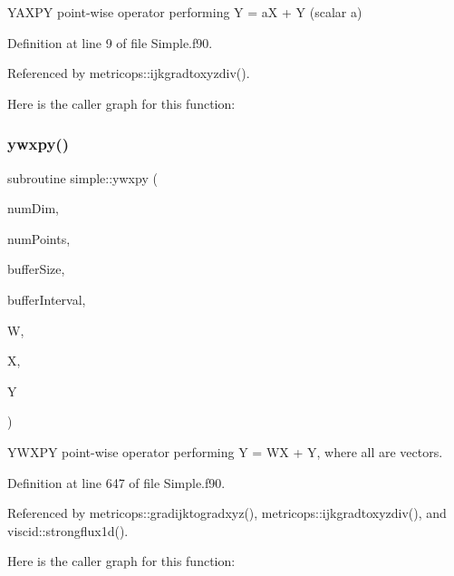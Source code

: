 Y\+A\+X\+PY point-\/wise operator performing Y = aX + Y (scalar a) 



Definition at line 9 of file Simple.\+f90.



Referenced by metricops\+::ijkgradtoxyzdiv().

Here is the caller graph for this function\+:
\hypertarget{namespacesimple_ac64e3827babc8b5361993623eb2a11ce}{}\label{namespacesimple_ac64e3827babc8b5361993623eb2a11ce} 
\subsubsection{\texorpdfstring{ywxpy()}{ywxpy()}}
{\footnotesize\ttfamily subroutine simple\+::ywxpy (\begin{DoxyParamCaption}\item[{integer(kind=4), intent(in)}]{num\+Dim,  }\item[{integer(kind=8), intent(in)}]{num\+Points,  }\item[{integer(kind=8), dimension(numdim), intent(in)}]{buffer\+Size,  }\item[{integer(kind=8), dimension(2$\ast$numdim), intent(in)}]{buffer\+Interval,  }\item[{real(kind=8), dimension(numpoints), intent(in)}]{W,  }\item[{real(kind=8), dimension(numpoints), intent(in)}]{X,  }\item[{real(kind=8), dimension(numpoints), intent(inout)}]{Y }\end{DoxyParamCaption})}



Y\+W\+X\+PY point-\/wise operator performing Y = WX + Y, where all are vectors. 



Definition at line 647 of file Simple.\+f90.



Referenced by metricops\+::gradijktogradxyz(), metricops\+::ijkgradtoxyzdiv(), and viscid\+::strongflux1d().

Here is the caller graph for this function\+:
\hypertarget{namespacesimple_aa765b03714e925077509bc7c42aa59eb}{}\label{namespacesimple_aa765b03714e925077509bc7c42aa59eb} 
